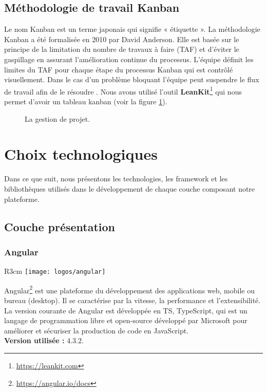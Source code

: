 \subsection{Méthodologie de travail Kanban}
Le nom Kanban est un terme japonais qui signifie « étiquette ». La méthodologie Kanban a été formalisée en 2010 par David Anderson. Elle est basée sur le principe de la limitation du nombre de travaux à faire (TAF) et d’éviter le gaspillage en assurant l’amélioration continue du processus. L’équipe définit les limites du TAF pour chaque étape du processus Kanban qui est contrôlé visuellement. Dans le cas d’un problème bloquant l’équipe peut suspendre le flux de travail afin de le résoudre \citep{anderson2010kanban}. Nous avons utilisé l'outil \textbf{LeanKit}\footnote{\href{https://leankit.com}{https://leankit.com}} qui nous permet d'avoir un tableau kanban (voir la figure \ref{fig:kanbanexmple}).
\begin{figure}[H]
	\centering
	\caption{La gestion de projet.}
	\label{fig:kanbanexmple}
\end{figure}

\section{Choix technologiques}
Dans ce que suit, nous présentons les technologies, les framework et les bibliothèques utilisés dans le développement de chaque couche composant notre plateforme. 
\subsection{Couche présentation}
\subsubsection{Angular}
\begin{wrapfigure}{R}{3cm}	
	\vspace{-20px}
	\texttt{[image: logos/angular]}
\end{wrapfigure} 
Angular\footnote{\href{https://angular.io/docs}{https://angular.io/docs}} est une plateforme du développement des applications web, mobile ou bureau (desktop). Il se caractérise par la vitesse, la performance et l’extensibilité. La version courante de Angular est développée en TS, TypeScript, qui est un langage de programmation libre et open-source développé par Microsoft pour améliorer et sécuriser la production de code en JavaScript.\\
\textbf{Version utilisée :} 4.3.2.
\clearpage

